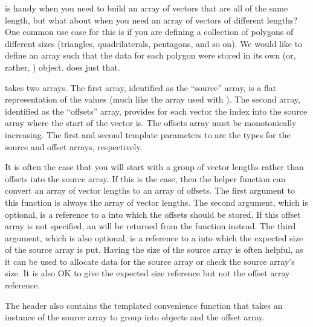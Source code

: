  is handy when you need to build an array of vectors that are all of the same length, but what about when you need an array of vectors of different lengths?
One common use case for this is if you are defining a collection of polygons of different sizes (triangles, quadrilaterals, pentagons, and so on).
We would like to define an array such that the data for each polygon were stored in its own  (or, rather, \Veclike) object.
 does just that.

 takes two arrays. The first array, identified as the ``source'' array, is a flat representation of the values (much like the array used with ).
The second array, identified as the ``offsets'' array, provides for each vector the index into the source array where the start of the vector is.
The offsets array must be monotonically increasing.
The first and second template parameters to  are the types for the source and offset arrays, respectively.

It is often the case that you will start with a group of vector lengths rather than offsets into the source array.
If this is the case, then the  helper function can convert an array of vector lengths to an array of offsets.
The first argument to this function is always the array of vector lengths.
The second argument, which is optional, is a reference to a  into which the offsets should be stored.
If this offset array is not specified, an  will be returned from the function instead.
The third argument, which is also optional, is a reference to a  into which the expected size of the source array is put.
Having the size of the source array is often helpful, as it can be used to allocate data for the source array or check the source array's size.
It is also OK to give the expected size reference but not the offset array reference.


The  header also contains the templated convenience function  that takes an instance of the source array to group into \Veclike objects and the offset array.

